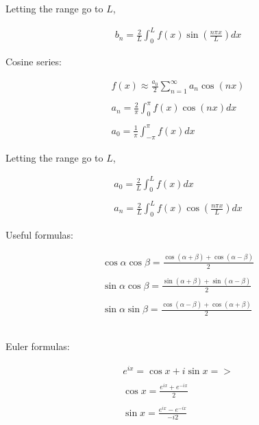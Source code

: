 \documentclass[11pt]{article}
\begin{document}
\begin{enumerate}
Letting the range go to $L$,

\begin{align*}
    b_{n} = \frac{2}{L} \int_{0}^{L} f(x) \sin (\frac{n \pi x}{L}) dx
\end{align*}


Cosine series:

\begin{align*}
    f(x) \approx \frac{a_{0}}{2} \sum_{n=1}^{\infty} a_{n} \cos(nx) \\ \\
    a_{n} = \frac{2}{\pi} \int_{0}^{\pi} f(x)\cos(nx) dx \\ \\
    a_{0} = \frac{1}{\pi} \int_{-\pi}^{\pi} f(x) dx
\end{align*}

Letting the range go to $L$,

\begin{align*}
    a_{0} = \frac{2}{L} \int_{0}^{L} f(x) dx \\\\
    a_{n} = \frac{2}{L} \int_{0}^{L} f(x) \cos(\frac{n \pi x}{L})dx
\end{align*}

Useful formulas:

\begin{align*}
    \cos\alpha \cos\beta = \frac{\cos(\alpha + \beta)+\cos(\alpha - \beta)}{2} \\ \\
    \sin\alpha \cos\beta = \frac{\sin(\alpha + \beta)+\sin(\alpha - \beta)}{2} \\\\
    \sin\alpha \sin\beta = \frac{\cos(\alpha - \beta)+\cos(\alpha + \beta)}{2} \\\\\\
\end{align*}





Euler formulas:

\begin{align*}
     e^{ix}=\cos x + i\sin x => \\\\
     \cos x = \frac{e^{ix} + e^{-ix}}{2}\\\\
     \sin x = \frac{e^{ix} - e^{-ix}}{-i2}\\\\
\end{align*}


\end{enumerate}
\end{document}
